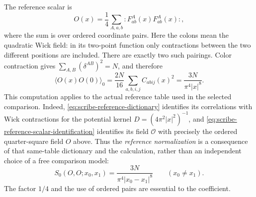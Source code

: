 The reference scalar is
\[
 O(x)=\frac14\sum_{A,a,b}:F_{ab}^A(x)F_{ab}^A(x):,
\]
where the sum is over ordered coordinate pairs. Here the colons mean the
quadratic Wick field: in its two-point function only contractions between
the two different positions are included. There are exactly two such
pairings. Color contraction gives
$\sum_{A,B}(\delta^{AB})^2=N$, and therefore
\begin{equation}\label{eq:trace-free-scalar}
 \langle O(x)O(0)\rangle_0
 =\frac{2N}{16}\sum_{a,b,i,j}C_{abij}(x)^2
 =\frac{3N}{\pi^4|x|^8}.
\end{equation}
This computation applies to the actual reference table used in the
selected comparison. Indeed,
\eqref{eq:scribe-reference-dictionary} identifies its correlations with
Wick contractions for the potential kernel $D=(4\pi^2|x|^2)^{-1}$,
and \eqref{eq:scribe-reference-scalar-identification} identifies its
field $\mathcal O$ with precisely the ordered quarter-square field $O$
above. Thus the \emph{reference normalization} is a consequence of
that same-table dictionary and the calculation, rather than an
independent choice of a free comparison model:
\begin{equation}\label{eq:trace-reference-normalization}
 S_0(O,O;x_0,x_1)=\frac{3N}{\pi^4|x_0-x_1|^8}\qquad(x_0\neq x_1).
\end{equation}
The factor $1/4$ and the use of ordered
pairs are essential to the coefficient.

